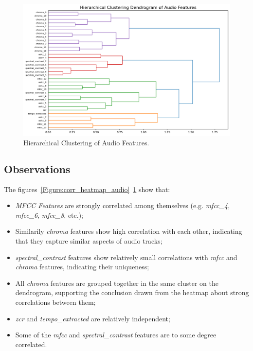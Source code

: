 \begin{center}
\begin{figure}[H]
  \centering
  \includegraphics[width=6in]{img/dendrogram_audio.png}
  \caption{Hierarchical Clustering of Audio Features.}
  \label{Figure:dendrogram_audio}
\end{figure}
\end{center}


\subsection*{Observations}
The figures~\ref{Figure:corr_heatmap_audio}~\ref{Figure:dendrogram_audio} show that:
\begin{itemize}
  \item \textit{MFCC Features} are strongly correlated among themselves (e.g.
    \textit{mfcc\_4}, \textit{mfcc\_6}, \textit{mfcc\_8}, etc.);
  \item Similarily \textit{chroma} features show high correlation with each
    other, indicating that they capture similar aspects of audio tracks;
  \item \textit{spectral\_contrast} features show relatively small
    correlations with \textit{mfcc} and  \textit{chroma} features, indicating 
    their uniqueness;
  \item All \textit{chroma} features are grouped together in the same cluster
    on the dendrogram, supporting the conclusion drawn from the heatmap about
    strong correlations between them;
  \item \textit{zcr} and \textit{tempo\_extracted} are relatively independent;
  \item Some of the \textit{mfcc} and \textit{spectral\_contrast} features
    are to some degree correlated.
\end{itemize}

